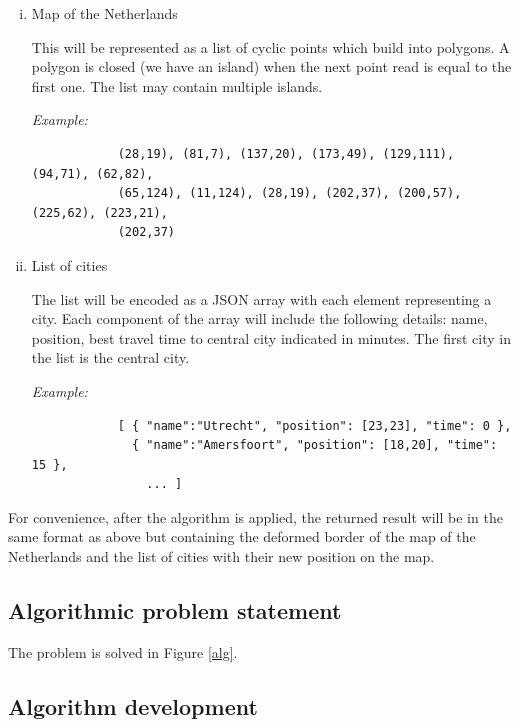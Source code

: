 \documentclass[a4paper,11pt]{article}
\begin{document}
\begin{enumerate}[(i)]
	\item Map of the Netherlands
	
		This will be represented as a list of cyclic points which build into polygons. A polygon is closed (we have an island) when the next point read is equal to the first one. The list may contain multiple islands.
		
		\emph{Example:} 
		\begin{verbatim}
			(28,19), (81,7), (137,20), (173,49), (129,111), (94,71), (62,82),
			(65,124), (11,124), (28,19), (202,37), (200,57), (225,62), (223,21),
			(202,37)
		\end{verbatim}

	\item List of cities
	
		The list will be encoded as a JSON array with each element representing a city. Each component of the array will include the following details: name, position, best travel time to central city indicated in minutes. The first city in the list is the central city.
		
		\emph{Example:}
		\begin{verbatim}
			[ { "name":"Utrecht", "position": [23,23], "time": 0 },
			  { "name":"Amersfoort", "position": [18,20], "time": 15 },
				... ]
		\end{verbatim}
\end{enumerate}

For convenience, after the algorithm is applied, the returned result will be in the same format as above but containing the deformed border of the map of the Netherlands and the list of cities with their new position on the map.

\subsection{Algorithmic problem statement}

The problem is solved in Figure \ref{alg}.

\subsection{Algorithm development}
\end{document}
